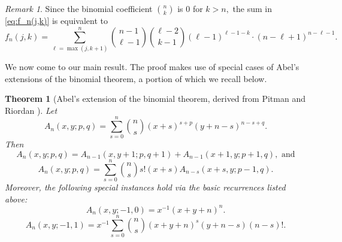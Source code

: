 \documentclass[12pt,reqno]{amsart}
\newtheorem{theorem}{Theorem}[section]
\theoremstyle{definition}
\theoremstyle{remark}
\newtheorem{remark}{Remark}
\begin{document}
\begin{remark}\label{rk:pos}
    Since the binomial coefficient $\binom{n}{k}$ is $0$ for $k>n,$ the sum in \eqref{eq:f_n(j,k)} is equivalent to \[f_n(j,k)=\sum_{\ell=\max(j,k+1)}^n\binom{n-1}{\ell-1} \binom{\ell-2}{k-1}(\ell-1)^{\ell-1-k} \cdot (n-\ell+1)^{n-\ell-1}.\] 
\end{remark}



We now come to our main result. The proof makes use of special cases of Abel's extensions of the binomial theorem, a portion of which we recall below.

\begin{theorem}[Abel's extension of the binomial theorem, derived from Pitman \cite{Pitman} and Riordan \cite{Riordan}]\label{Abel}
Let
\begin{equation*}\label{b}
A_n(x, y; p, q)=\sum_{s=0}^n \binom{n}{s} (x+s)^{s+p} (y+n-s)^{n-s+q}.
\end{equation*}
Then
\begin{equation*}\label{b2}
A_n(x, y; p, q)=A_{n-1}(x, y+1; p, q+1)+A_{n-1}(x+1, y; p+1, q), \textrm{ and}
\end{equation*}
\begin{equation*}\label{b3}
A_n(x, y; p, q)=\sum_{s=0}^{n} \binom{n}{s}s!(x+s)A_{n-s}(x+s, y; p-1, q).
\end{equation*}
Moreover, the following special instances hold via the basic recurrences listed above:
\begin{equation}\label{2}
A_n(x, y; -1, 0)=x^{-1}(x+y+n)^n.
\end{equation}
\begin{equation}\label{3}
A_n(x, y; -1, 1)=x^{-1} \sum_{s=0}^n \binom{n}{s} (x+y+n)^s (y+n-s) (n-s)!.
\end{equation}
\end{theorem}



\expectedvalueresult*
\end{document}
